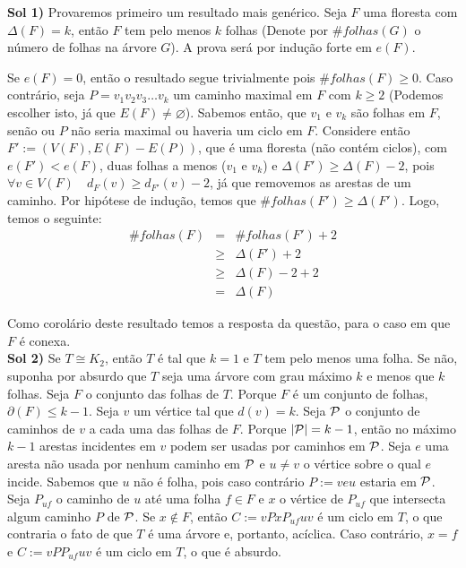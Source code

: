 
 {\bf Sol 1)} Provaremos primeiro um resultado mais genérico.
%
Seja $F$ uma floresta com $\Delta(F) = k$, então $F$ tem pelo menos $k$ folhas (Denote por $\# folhas(G)$ o número de folhas na árvore $G$). A prova será por indução forte em $e(F)$.

Se $e(F) = 0$, então o resultado segue trivialmente pois $\# folhas(F) \ge 0$.
%
Caso contrário, seja $P = v_1v_2v_3\ldots v_k$ um caminho maximal em $F$ com $k \ge 2$ (Podemos escolher isto, já que $E(F) \ne \varnothing$).
%
Sabemos então, que $v_1$ e $v_k$ são folhas em $F$, senão ou $P$ não seria maximal ou haveria um ciclo em $F$.
%
Considere então $F' := (V(F),E(F)-E(P))$, que é uma floresta (não contém ciclos), com $e(F') < e(F)$, duas folhas a menos ($v_1$ e $v_k$) e $\Delta(F') \ge \Delta(F) - 2$, pois $\forall v\in V(F)\quad d_F(v) \ge d_{F'}(v) - 2$, já que removemos as arestas de um caminho.
%
Por hipótese de indução, temos que $\# folhas(F') \ge \Delta(F')$.
%
Logo, temos o seguinte: 
\begin{eqnarray}
	\#folhas(F) &=& \# folhas(F') + 2  \nonumber \\
		  &\ge& \Delta(F') + 2 	   \nonumber \\
		  &\ge& \Delta(F) - 2 + 2  \nonumber \\
		    &=& \Delta(F) \nonumber
\end{eqnarray}
\fimprova

Como corolário deste resultado temos a resposta da questão, para o caso em que $F$ é conexa.\\

{\bf Sol 2)} Se $T \cong K_2$, então $T$ é tal que $k = 1$ e $T$ tem pelo menos
uma folha. Se não, suponha por absurdo que $T$ seja uma árvore com grau máximo
$k$ e menos que $k$ folhas. Seja $F$ o conjunto das folhas de $T$. Porque $F$ é
um conjunto de folhas, $\partial(F) \le k - 1$. Seja $v$ um vértice tal que
$d(v) = k$. Seja ${\cal P}$ o conjunto de caminhos de $v$ a cada uma das folhas
de $F$. Porque $|{\cal P}| = k - 1$, então no máximo $k - 1$ arestas incidentes
em $v$ podem ser usadas por caminhos em ${\cal P}$. Seja $e$ uma aresta não
usada por nenhum caminho em ${\cal P}$ e $u \ne v$ o vértice sobre o qual $e$
incide. Sabemos que $u$ não é folha, pois caso contrário $P := veu$ estaria em
${\cal P}$. Seja $P_{uf}$ o caminho de $u$ até uma folha $f \in F$ e $x$ o
vértice de $P_{uf}$ que intersecta algum caminho $P$ de ${\cal P}$. Se $x \not
\in F$, então $C := vPxP_{uf}uv$ é um ciclo em $T$, o que contraria o fato de
que $T$ é uma árvore e, portanto, acíclica. Caso contrário, $x = f$ e $C :=
vPP_{uf}uv$ é um ciclo em $T$, o que é absurdo.
\fimprova


